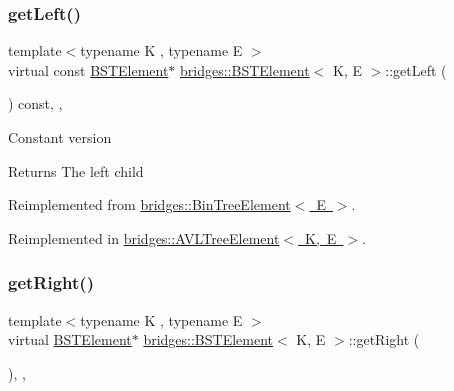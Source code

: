 \mbox{\label{classbridges_1_1_b_s_t_element_a2abcfb991f6cc377da2bd9217319fc9c}} 
\subsubsection{\texorpdfstring{get\+Left()}{getLeft()}\hspace{0.1cm}{\footnotesize\ttfamily [2/2]}}
{\footnotesize\ttfamily template$<$typename K , typename E $>$ \\
virtual const \mbox{\hyperlink{classbridges_1_1_b_s_t_element}{B\+S\+T\+Element}}$\ast$ \mbox{\hyperlink{classbridges_1_1_b_s_t_element}{bridges\+::\+B\+S\+T\+Element}}$<$ K, E $>$\+::get\+Left (\begin{DoxyParamCaption}{ }\end{DoxyParamCaption}) const\hspace{0.3cm}{\ttfamily [inline]}, {\ttfamily [override]}, {\ttfamily [virtual]}}

Constant version

\begin{DoxyReturn}{Returns}
The left child 
\end{DoxyReturn}


Reimplemented from \mbox{\hyperlink{classbridges_1_1_bin_tree_element_a0841701bd7d4b444dafbbdfefed067a5}{bridges\+::\+Bin\+Tree\+Element$<$ E $>$}}.



Reimplemented in \mbox{\hyperlink{classbridges_1_1_a_v_l_tree_element_a61e075db5414b7bd6f52d657401acda3}{bridges\+::\+A\+V\+L\+Tree\+Element$<$ K, E $>$}}.

\mbox{\label{classbridges_1_1_b_s_t_element_a35e93bce32de933522dccde5f2b5ffd9}} 
\subsubsection{\texorpdfstring{get\+Right()}{getRight()}\hspace{0.1cm}{\footnotesize\ttfamily [1/2]}}
{\footnotesize\ttfamily template$<$typename K , typename E $>$ \\
virtual \mbox{\hyperlink{classbridges_1_1_b_s_t_element}{B\+S\+T\+Element}}$\ast$ \mbox{\hyperlink{classbridges_1_1_b_s_t_element}{bridges\+::\+B\+S\+T\+Element}}$<$ K, E $>$\+::get\+Right (\begin{DoxyParamCaption}{ }\end{DoxyParamCaption})\hspace{0.3cm}{\ttfamily [inline]}, {\ttfamily [override]}, {\ttfamily [virtual]}}

